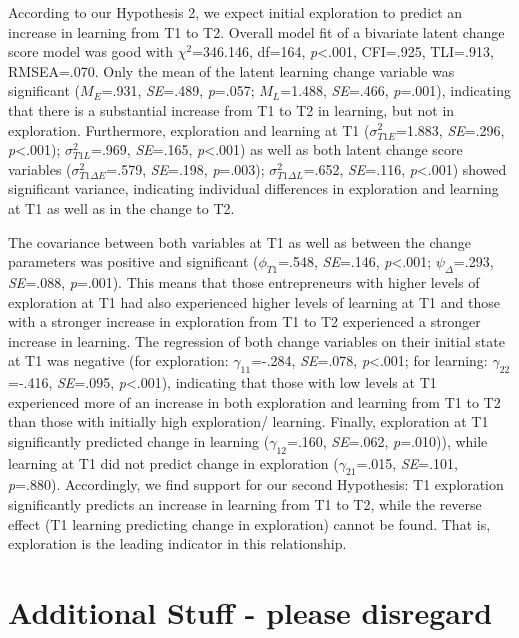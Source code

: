 \documentclass[man, 12pt, a4paper, noextraspace]{apa6}
\begin{document}
According to our Hypothesis 2, we expect initial exploration to predict an increase in learning from T1 to T2. 
Overall model fit of a bivariate latent change score model was good with $\chi^2$=346.146, df=164, \textit{p}<.001, CFI=.925, TLI=.913, RMSEA=.070. 
Only the mean of the latent learning change variable was significant ($\textit{M}_E$=.931, \textit{SE}=.489, \textit{p}=.057; $\textit{M}_L$=1.488, \textit{SE}=.466, \textit{p}=.001), indicating that there is a substantial increase from T1 to T2 in learning, but not in exploration. 
Furthermore, exploration and learning at T1 ($\sigma^2_{T1E}$=1.883, \textit{SE}=.296, \textit{p}<.001); $\sigma^2_{T1L}$=.969, \textit{SE}=.165, \textit{p}<.001) as well as both latent change score variables ($\sigma^2_{T1\Delta E}$=.579, \textit{SE}=.198, \textit{p}=.003); $\sigma^2_{T1\Delta L}$=.652, \textit{SE}=.116, \textit{p}<.001) showed significant variance, indicating individual differences in exploration and learning at T1 as well as in the change to T2. \par 
The covariance between both variables at T1 as well as between the change parameters was positive and significant ($\phi_{T1}$=.548, \textit{SE}=.146, \textit{p}<.001; $\psi_{\Delta}$=.293, \textit{SE}=.088, \textit{p}=.001). 
This means that those entrepreneurs with higher levels of exploration at T1 had also experienced higher levels of learning at T1 and those with a stronger increase in exploration from T1 to T2 experienced a stronger increase in learning. 
The regression of both change variables on their initial state at T1 was negative (for exploration: $\gamma_{11}$=-.284, \textit{SE}=.078, \textit{p}<.001; for learning: $\gamma_{22}$=-.416, \textit{SE}=.095, \textit{p}<.001), indicating that those with low levels at T1 experienced more of an increase in both exploration and learning from T1 to T2 than those with initially high exploration/ learning. 
Finally, exploration at T1 significantly predicted change in learning ($\gamma_{12}$=.160, \textit{SE}=.062, \textit{p}=.010)), while learning at T1 did not predict change in exploration ($\gamma_{21}$=.015, \textit{SE}=.101, \textit{p}=.880). 
Accordingly, we find support for our second Hypothesis: T1 exploration significantly predicts an increase in learning from T1 to T2, while the reverse effect (T1 learning predicting change in exploration) cannot be found. 
That is, exploration is the leading indicator in this relationship. 




\section{Additional Stuff - please disregard}
\end{document}
